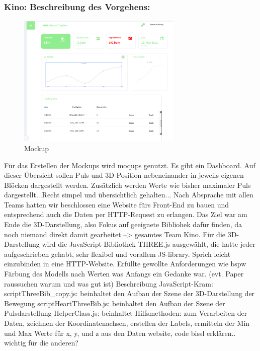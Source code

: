 \documentclass[a4paper, 11pt]{article}
\begin{document}
\subsubsection{Kino: Beschreibung des Vorgehens:}

\begin{figure}[H]
    \centering
    \includegraphics[width=0.7\textwidth]{images/MHS_Mockup.png}
    \caption{Mockup}
    \label{fig:Mockup}
\end{figure}

Für das Erstellen der Mockups wird moqups genutzt.
\newline
Es gibt ein Dashboard. Auf dieser Übersicht sollen Puls und 3D-Position nebeneinander in jeweils eigenen Blöcken dargestellt werden.
Zusätzlich werden Werte wie bisher maximaler Puls dargestellt...Recht simpel und übersichtlich gehalten...\newline
\newline
Nach Absprache mit allen Teams hatten wir beschlossen eine Website fürs Front-End zu bauen und entsprechend auch die Daten per HTTP-Request zu erlangen.
Das Ziel war am Ende die 3D-Darstellung, also Fokus auf geeignete Bibliohek dafür finden, da noch niemand direkt damit gearbeitet --> gesamtes Team Kino.
\newline Für die 3D-Darstellung wird die JavaScript-Bibliothek THREE.js ausgewählt, die hatte jeder aufgeschrieben gehabt, sehr flexibel und vorallem JS-library.
Sprich leicht einzubinden in eine HTTP-Website. Erfüllte gewollte Anforderungen wie bspw Färbung des Modells nach Werten was Anfangs ein Gedanke war.
(evt. Paper raussuchen warum und was gut ist)\newline
\newline
Beschreibung JavaScript-Kram: \newline
scriptThreeBib\_copy.js: beinhaltet den Aufbau der Szene der 3D-Darstellung der Bewegung \newline
scriptHeartThreeBib.js: beinhaltet den Aufbau der Szene der Pulsdarstellung \newline
HelperClass.js: beinhaltet Hilfsmethoden: zum Verarbeiten der Daten, zeichnen der Koordinatenachsen, erstellen der Labels, ermitteln der Min und Max Werte für x, y, und z aus den Daten
\newline website, code bissl erklären.. wichtig für die anderen?
\end{document}
